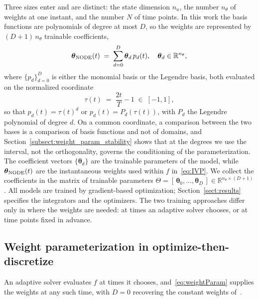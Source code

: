 \documentclass[pdflatex,sn-mathphys-num]{sn-jnl}%
\newcommand{\bftheta}{\boldsymbol{\theta}}
\theoremstyle{thmstyleone}%
\theoremstyle{thmstyletwo}%
\theoremstyle{thmstylethree}%
\begin{document}
Three sizes enter and are distinct: the state dimension $n_u$, the number $n_\theta$ of weights at one instant, and the number $N$ of time points.
%
In this work the basis functions are polynomials of degree at most $D$, so the weights are represented by $(D+1)\,n_\theta$ trainable coefficients,
\begin{equation}\label{eq:weightParam}
  \bftheta_{\rm NODE}(t)
  \;=\;
  \sum_{d=0}^{D} \bftheta_{d}\,p_d(t),
  \quad \bftheta_d \in \mathbb{R}^{n_\theta},
\end{equation}
where $\{p_d\}_{d=0}^D$ is either the monomial basis or the Legendre basis, both evaluated on the normalized coordinate
\begin{equation}\label{eq:tau}
    \tau(t) \;=\; \frac{2t}{T} - 1 \;\in\; [-1,1],
\end{equation}
so that $p_d(t)=\tau(t)^d$ or $p_d(t)=P_d(\tau(t))$, with $P_d$ the Legendre polynomial of degree $d$.
%
On a common coordinate, a comparison between the two bases is a comparison of basis functions and not of domains, and Section~\ref{subsect:weight_param_stability} shows that at the degrees we use the interval, not the orthogonality, governs the conditioning of the parameterization.
%
The coefficient vectors $\{\bftheta_d\}$ are the trainable parameters of the model, while $\bftheta_{\rm NODE}(t)$ are the instantaneous weights used within $f$ in~\eqref{eq:IVP}.
%
We collect the coefficients in the matrix of trainable parameters $\Theta = [\,\bftheta_0, \ldots, \bftheta_D\,] \in \mathbb{R}^{n_\theta \times (D+1)}$.
%
All models are trained by gradient-based optimization; Section~\ref{sect:results} specifies the integrators and the optimizers.
%
The two training approaches differ only in where the weights are needed: at times an adaptive solver chooses, or at time points fixed in advance.

\subsection{Weight parameterization in optimize-then-discretize}\label{subsect:optdisc_weightParam}
An adaptive solver evaluates $f$ at times it chooses, and~\eqref{eq:weightParam} supplies the weights at any such time, with $D=0$ recovering the constant weights of~\cite{ChenEtAl2018}.
\end{document}
